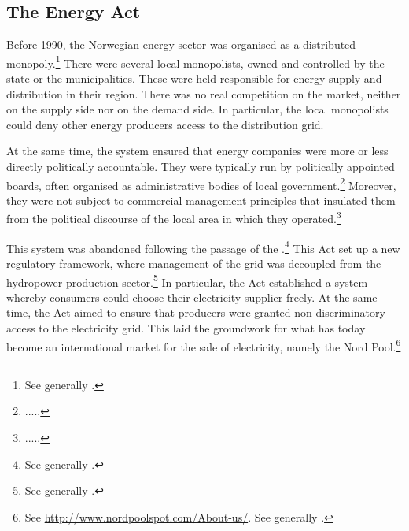 \subsection{The Energy Act}\label{sec:ea}

Before 1990, the Norwegian energy sector was organised as a distributed monopoly.\footnote{See generally \cite{bye05,skjold07}.} There were several local monopolists, owned and controlled by the state or the municipalities. These were held responsible for energy supply and distribution in their region. There was no real competition on the market, neither on the supply side nor on the demand side. In particular, the local monopolists could deny other energy producers access to the distribution grid.

At the same time, the system ensured that energy companies were more or less directly politically accountable. They were typically run by politically appointed boards, often organised as administrative bodies of local government.\footnote{.....} Moreover, they were not subject to commercial management principles that insulated them from the political discourse of the local area in which they operated.\footnote{.....}

This system was abandoned following the passage of the \cite{ea90}.\footnote{See generally \cite{bibow11}.} This Act set up a new regulatory framework, where management of the grid was decoupled from the hydropower production sector.\footnote{See generally \cite{bye05}.} In particular, the Act established a system whereby consumers could choose their electricity supplier freely. At the same time, the Act aimed to ensure that producers were granted non-discriminatory access to the electricity grid. This laid the groundwork for what has today become an international market for the sale of electricity, namely the Nord Pool.\footnote{See \url{http://www.nordpoolspot.com/About-us/}. See generally \cite{skjold07,galtung07}.}

